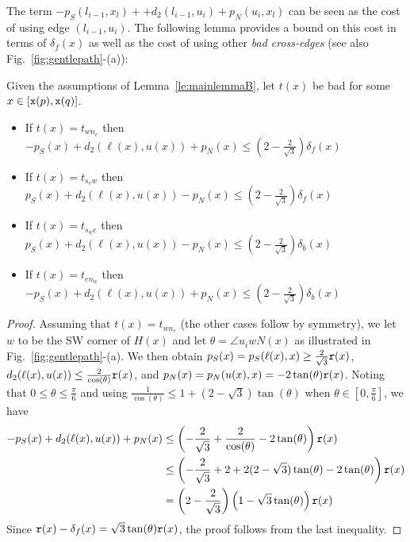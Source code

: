 The term $- p_S(l_{i-1},x_l) + + d_2(l_{i-1},u_i) + p_N(u_i, x_l)$ can be seen
as the cost of using edge $(l_{i-1},u_i)$. The following lemma provides a bound
on this cost in terms of $\delta_f(x)$ as well as the cost of using other 
{\em bad cross-edges} (see also Fig.~\ref{fig:gentlepath}-(a)):
\begin{lemma}
\label{lem:switchpath}
Given the assumptions of Lemma~\ref{le:mainlemmaB}, let $t(x)$ be bad for some
$x \in [{\tt x}(p), {\tt x}(q)]$.%
%
\begin{itemize}
\item If $t(x) = t_{wn_e}$ then
$-p_S(x) + d_2(\ell(x),u(x)) + p_N(x) \leq \left(2 - \frac{2}{\sqrt{3}}\right)\delta_f(x)$
\item If $t(x) = t_{s_ew}$ then
$p_S(x) + d_2(\ell(x),u(x)) - p_N(x) \leq \left(2 - \frac{2}{\sqrt{3}}\right)\delta_f(x)$
\item If $t(x) = t_{s_we}$ then
$p_S(x) + d_2(\ell(x),u(x)) - p_N(x) \leq \left(2 - \frac{2}{\sqrt{3}}\right)\delta_b(x)$
\item If $t(x) = t_{en_w}$ then
$-p_S(x) + d_2(\ell(x),u(x)) + p_N(x) \leq \left(2 - \frac{2}{\sqrt{3}}\right)\delta_b(x)$
\end{itemize}
\end{lemma}
%
\begin{proof}
Assuming that $t(x) = t_{wn_e}$ (the other cases follow
by symmetry),
%
%
we let $w$ to be the SW corner of $H(x)$ and let $\theta = \angle u_i w N(x)$
as illustrated in Fig.~\ref{fig:gentlepath}-(a). We then
%
obtain
$p_S(x)=p_S(\ell(x),x) \geq \frac{2}{\sqrt{3}}{\tt r}(x)$,
$d_2(\ell(x), u(x)) \leq \frac{2}{\cos(\theta)}{\tt r}(x)$, and
$p_N(x)=p_N(u(x),x) = -2\tan(\theta){\tt r}(x)$.
%	
Noting that
$0 \leq \theta \leq \frac{\pi}{6}$ and
	using
$\frac{1}{\cos(\theta)} \leq 1 + (2-\sqrt{3})\tan(\theta)$ when
$\theta \in [0,\frac{\pi}{6}]$, 
we have
\begin{align*}
-p_S(x) + d_2(\ell(x),u(x)) + p_N(x) & \leq \left(-\frac{2}{\sqrt{3}} + \frac{2}{\cos(\theta)} -2\tan(\theta)\right){\tt r}(x)\\
& \leq \left(-\frac{2}{\sqrt{3}} + 2 + 2(2-\sqrt{3})\tan(\theta) -2\tan(\theta)\right){\tt r}(x) \\
& = \left(2-\frac{2}{\sqrt{3}}\right)\left(1-\sqrt{3}\tan(\theta)\right){\tt r}(x)
\end{align*}
Since ${\tt r}(x) - \delta_f(x) = \sqrt{3}\tan(\theta){\tt r}(x)$, the proof
follows from the last inequality.
\end{proof}

